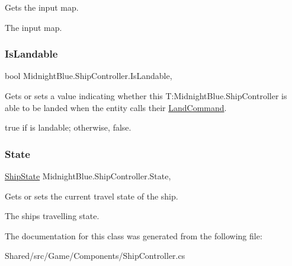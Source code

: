 Gets the input map. 

The input map.\hypertarget{class_midnight_blue_1_1_ship_controller_ad07cfa737db5a712aedcc2528b953683}{}\label{class_midnight_blue_1_1_ship_controller_ad07cfa737db5a712aedcc2528b953683} 
\subsubsection{\texorpdfstring{Is\+Landable}{IsLandable}}
{\footnotesize\ttfamily bool Midnight\+Blue.\+Ship\+Controller.\+Is\+Landable\hspace{0.3cm}{\ttfamily [get]}, {\ttfamily [set]}}



Gets or sets a value indicating whether this T\+:\+Midnight\+Blue.\+Ship\+Controller is able to be landed when the entity calls their \hyperlink{class_midnight_blue_1_1_land_command}{Land\+Command}. 

{\ttfamily true} if is landable; otherwise, {\ttfamily false}.\hypertarget{class_midnight_blue_1_1_ship_controller_a032da447be3b66b7998349ae825d4edb}{}\label{class_midnight_blue_1_1_ship_controller_a032da447be3b66b7998349ae825d4edb} 
\subsubsection{\texorpdfstring{State}{State}}
{\footnotesize\ttfamily \hyperlink{namespace_midnight_blue_a46fd3250d826e0dec67892328d5b368c}{Ship\+State} Midnight\+Blue.\+Ship\+Controller.\+State\hspace{0.3cm}{\ttfamily [get]}, {\ttfamily [set]}}



Gets or sets the current travel state of the ship. 

The ships travelling state.

The documentation for this class was generated from the following file\+:\begin{DoxyCompactItemize}
\item 
Shared/src/\+Game/\+Components/Ship\+Controller.\+cs\end{DoxyCompactItemize}
